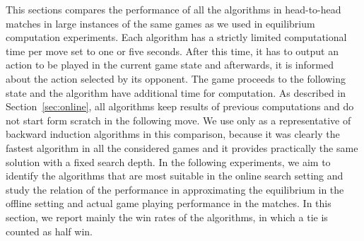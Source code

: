 This sections compares the performance of all the algorithms in head-to-head matches in large instances of the same games as we used in equilibrium computation experiments. Each algorithm has a strictly limited computational time per move set to one or five seconds. After this time, it has to output an action to be played in the current game state and afterwards, it is informed about the action selected by its opponent. The game proceeds to the following state and the algorithm have additional time for computation. As described in Section~\ref{sec:online}, all algorithms keep results of previous computations and do not start form scratch in the following move. 
We use only \doab as a representative of backward induction algorithms in this comparison, because it was clearly the fastest algorithm in all the considered games and it provides practically the same solution with a fixed search depth.
In the following experiments, we aim to identify the algorithms that are most suitable in the online search setting and study the relation of the performance in approximating the equilibrium in the offline setting and actual game playing performance in the matches. In this section, we report mainly the win rates of the algorithms, in which a tie is counted as half win.


